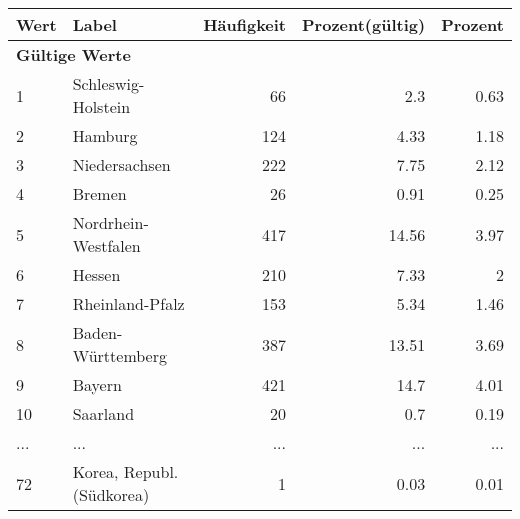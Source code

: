      \begin{longtable}{lXrrr}
     \toprule
     \textbf{Wert} & \textbf{Label} & \textbf{Häufigkeit} & \textbf{Prozent(gültig)} & \textbf{Prozent} \\
     \endhead
     \midrule
     \multicolumn{5}{l}{\textbf{Gültige Werte}}\\
        1 & \multicolumn{1}{X}{Schleswig-Holstein} & %
          \num{66} &
          \num[round-mode=places,round-precision=2]{2.3} &
          \num[round-mode=places,round-precision=2]{0.63} \\
        2 & \multicolumn{1}{X}{Hamburg} & %
          \num{124} &
          \num[round-mode=places,round-precision=2]{4.33} &
          \num[round-mode=places,round-precision=2]{1.18} \\
        3 & \multicolumn{1}{X}{Niedersachsen} & %
          \num{222} &
          \num[round-mode=places,round-precision=2]{7.75} &
          \num[round-mode=places,round-precision=2]{2.12} \\
        4 & \multicolumn{1}{X}{Bremen} & %
          \num{26} &
          \num[round-mode=places,round-precision=2]{0.91} &
          \num[round-mode=places,round-precision=2]{0.25} \\
        5 & \multicolumn{1}{X}{Nordrhein-Westfalen} & %
          \num{417} &
          \num[round-mode=places,round-precision=2]{14.56} &
          \num[round-mode=places,round-precision=2]{3.97} \\
        6 & \multicolumn{1}{X}{Hessen} & %
          \num{210} &
          \num[round-mode=places,round-precision=2]{7.33} &
          \num[round-mode=places,round-precision=2]{2} \\
        7 & \multicolumn{1}{X}{Rheinland-Pfalz} & %
          \num{153} &
          \num[round-mode=places,round-precision=2]{5.34} &
          \num[round-mode=places,round-precision=2]{1.46} \\
        8 & \multicolumn{1}{X}{Baden-Württemberg} & %
          \num{387} &
          \num[round-mode=places,round-precision=2]{13.51} &
          \num[round-mode=places,round-precision=2]{3.69} \\
        9 & \multicolumn{1}{X}{Bayern} & %
          \num{421} &
          \num[round-mode=places,round-precision=2]{14.7} &
          \num[round-mode=places,round-precision=2]{4.01} \\
        10 & \multicolumn{1}{X}{Saarland} & %
          \num{20} &
          \num[round-mode=places,round-precision=2]{0.7} &
          \num[round-mode=places,round-precision=2]{0.19} \\
       ... & ... & ... & ... & ... \\
        72 & \multicolumn{1}{X}{Korea, Republ. (Südkorea)} & %
          \num{1} &
          \num[round-mode=places,round-precision=2]{0.03} &
          \num[round-mode=places,round-precision=2]{0.01} \\


\end{longtable}
